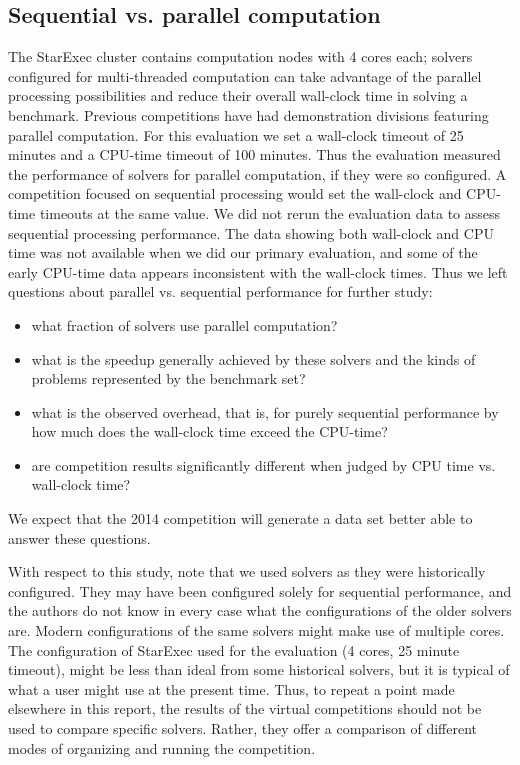 \documentclass[smallcondensed]{svjour3}
\begin{document}
\subsection{Sequential vs. parallel computation}
\label{parallel}

The StarExec cluster contains computation nodes with 4 cores each; solvers configured for multi-threaded computation can take advantage of the parallel processing possibilities and reduce their overall wall-clock time in solving a benchmark. Previous competitions have had demonstration divisions featuring parallel computation.
For this evaluation we set a wall-clock timeout of 25 minutes and a CPU-time timeout of 100 minutes. Thus the evaluation measured the performance of solvers for parallel computation, if they were so configured. A competition focused on sequential processing would set the wall-clock and CPU-time timeouts at the same value.
We did not rerun the evaluation data to assess sequential processing performance. The data showing both wall-clock and CPU time was not available when we did our 
primary evaluation, and some of the early CPU-time data appears inconsistent with the wall-clock times. Thus we left questions about parallel vs. sequential performance for further study: 
\begin{itemize}
\item what fraction of solvers use parallel computation?
\item what is the speedup generally achieved by these solvers and the kinds of problems represented by the benchmark set?
\item what is the observed overhead, that is, for purely sequential performance by how much does the wall-clock time exceed the CPU-time?
\item are competition results significantly different when judged by CPU time vs. wall-clock time?
\end{itemize}
We expect that the 2014 competition will generate a data set better able to answer these questions.

With respect to this study, note that we used solvers as they were historically configured. They may have been configured solely for sequential performance, and the authors do not know in every case what the configurations of the older solvers are. Modern configurations of the same solvers might make use of multiple cores. The configuration of StarExec used for the evaluation (4 cores, 25 minute timeout), might be less than ideal from some historical solvers, but it is typical of what a user might use at the present time. Thus, to repeat a point made elsewhere in this report, the results of the virtual competitions should not be used to compare specific solvers. Rather, they offer a comparison of different modes of organizing and running the competition.
\end{document}
